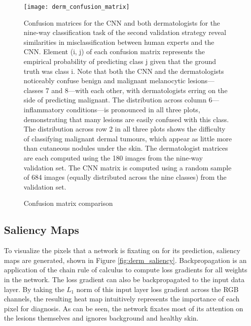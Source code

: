 \begin{figure}
\texttt{[image: derm\_confusion\_matrix]}
\caption{Confusion matrix comparison}
\vspace{12px}
Confusion matrices for the CNN and both dermatologists for the nine-way classification task of the second validation strategy reveal similarities in misclassification between human experts and the CNN. Element (i, j) of each confusion matrix represents the empirical probability of predicting class j given that the ground truth was class i. Note that both the CNN and the dermatologists noticeably confuse benign and malignant melanocytic lesions—classes 7 and 8—with each other, with dermatologists erring on the side of predicting malignant. The distribution across column 6—inflammatory conditions—is pronounced in all three plots, demonstrating that many lesions are easily confused with this class. The distribution across row 2 in all three plots shows the difficulty of classifying malignant dermal tumours, which appear as little more than cutaneous nodules under the skin. The dermatologist matrices are each computed using the 180 images from the nine-way validation set. The CNN matrix is computed using a random sample of 684 images (equally distributed across the nine classes) from the validation set.
\label{fig:derm_confusion_matrix}
\end{figure}

\subsection{Saliency Maps}
To visualize the pixels that a network is fixating on for its prediction, saliency maps are generated, shown in Figure \ref{fig:derm_saliency}. Backpropagation is an application of the chain rule of calculus to compute loss gradients for all weights in the network. The loss gradient can also be backpropagated to the input data layer. By taking the $L_1$ norm of this input layer loss gradient across the RGB channels, the resulting heat map intuitively represents the importance of each pixel for diagnosis. As can be seen, the network fixates most of its attention on the lesions themselves and ignores background and healthy skin.

